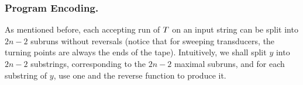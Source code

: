 \subsubsection{Program Encoding.}

As mentioned before, each accepting run of $T$ on an input string can be split into $2n-2$
subruns without reversals (notice that for sweeping transducers,  the turning points are always the ends of the tape).
%
Intuitively, we shall split $y$ into $2n-2$ substrings, corresponding to the
$2n-2$ maximal subruns, and for each substring of $y$, use one \PT{} and the
reverse function to produce it.



